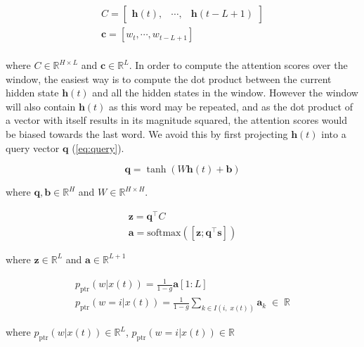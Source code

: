\begin{equation}
	\begin{gathered}
		C = \begin{bmatrix} \mathbf{h}(t), & \cdots, & \mathbf{h}(t-L+1) \end{bmatrix} \\
		\mathbf{c} = [w_t, \cdots, w_{t-L+1}] \\
	\end{gathered}
\end{equation}

where $C \in \mathbb{R}^{H \times L}$ and $\mathbf{c} \in \mathbb{R}^{L}$. In order to compute the attention scores over the window, the easiest way is to compute the dot product between the current hidden state $\mathbf{h}(t)$ and all the hidden states in the window. However the window will also contain $\mathbf{h}(t)$ as this word may be repeated, and as the dot product of a vector with itself results in its magnitude squared, the attention scores would be biased towards the last word. We avoid this by first projecting $\mathbf{h}(t)$ into a query vector $\mathbf{q}$ (\autoref{eq:query}).

\begin{equation} \label{eq:query}
		\mathbf{q} = \tanh(W\mathbf{h}(t) + \mathbf{b}) 
\end{equation}

where $\mathbf{q},\mathbf{b} \in \mathbb{R}^{H}$ and $W \in \mathbb{R}^{H \times H}$. 

\begin{equation}
	\begin{gathered}
		\mathbf{z} = \mathbf{q}^{\top} C \\
		\mathbf{a} = \text{softmax}([\mathbf{z}; \mathbf{q}^{\top} \mathbf{s}])
	\end{gathered}
\end{equation}

where $\mathbf{z} \in \mathbb{R}^{L}$ and $\mathbf{a} \in \mathbb{R}^{L+1}$

\begin{equation}
	\begin{gathered}
		p_{\text{ptr}}(w|x(t)) = \frac{1}{1-g}\mathbf{a}[1:L] \\
		p_{\text{ptr}}(w=i|x(t)) = \frac{1}{1-g}\sum_{k \in I(i, \; x(t))}\mathbf{a}_k \; \in \; \mathbb{R}
	\end{gathered}
\end{equation}

where $p_{\text{ptr}}(w|x(t)) \in \mathbb{R}^{L}$, $p_{\text{ptr}}(w=i|x(t)) \in \mathbb{R}$

